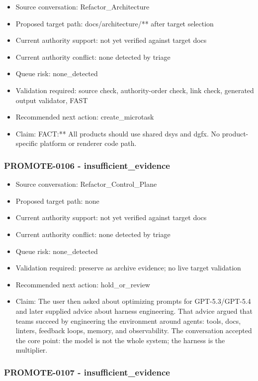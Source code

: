 \documentclass[11pt,a4paper]{report}
\begin{document}
\begin{itemize}
\item Source conversation: Refactor\_Architecture
\item Proposed target path: docs/architecture/** after target selection
\item Current authority support: not yet verified against target docs
\item Current authority conflict: none detected by triage
\item Queue risk: none\_detected
\item Validation required: source check, authority-order check, link check, generated output validator, FAST
\item Recommended next action: create\_microtask
\item Claim: FACT:** All products should use shared dsys and dgfx. No product-specific platform or renderer code path.
\end{itemize}

\subsubsection{PROMOTE-0106 - insufficient\_evidence}

\begin{itemize}
\item Source conversation: Refactor\_Control\_Plane
\item Proposed target path: none
\item Current authority support: not yet verified against target docs
\item Current authority conflict: none detected by triage
\item Queue risk: none\_detected
\item Validation required: preserve as archive evidence; no live target validation
\item Recommended next action: hold\_or\_review
\item Claim: The user then asked about optimizing prompts for GPT-5.3/GPT-5.4 and later supplied advice about harness engineering. That advice argued that teams succeed by engineering the environment around agents: tools, docs, linters, feedback loops, memory, and observability. The conversation accepted the core point: the model is not the whole system; the harness is the multiplier.
\end{itemize}

\subsubsection{PROMOTE-0107 - insufficient\_evidence}
\end{document}
